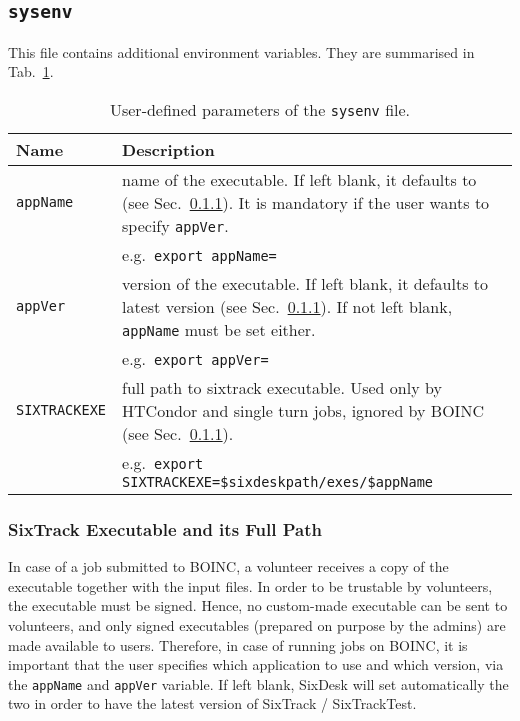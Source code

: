 \subsection{\texttt{sysenv}}\label{Sec:InputFiles:sysenv}
This file contains additional environment variables.
They are summarised in Tab.~\ref{tab:sysenv}.
\begin{table}[h]
\begin{center}
    \caption{User-defined parameters of the \texttt{sysenv} file.}
    \label{tab:sysenv}
    \begin{tabular}{|p{3cm}|p{12cm}|}
    \hline
    \rowcolor{blue!30}
    \textbf{Name} & \textbf{Description} \\
    \hline
    \texttt{appName} & name of the executable.
    If left blank, it defaults to \texttt{\whichSixTrackVersion{}} (see Sec.~\ref{Sec:SixTrackExes}).
    It is mandatory if the user wants to specify \texttt{appVer}. \\
    & e.g.~\texttt{export appName=\whichSixTrack{}} \\
    \hline
    \texttt{appVer} & version of the executable.
    If left blank, it defaults to latest version (see Sec.~\ref{Sec:SixTrackExes}).
    If not left blank, \texttt{appName} must be set either. \\
    & e.g.~\texttt{export appVer=\whichSixTrackVersion{}} \\
    \hline
    \texttt{SIXTRACKEXE} & full path to sixtrack executable.
    Used only by HTCondor and single turn jobs, ignored by BOINC
    (see Sec.~\ref{Sec:SixTrackExes}). \\
    & e.g.~\texttt{export SIXTRACKEXE=\$sixdeskpath/exes/\$appName} \\
    \hline
    \end{tabular}
\end{center}
\end{table}

\subsubsection{SixTrack Executable and its Full Path}\label{Sec:SixTrackExes}
In case of a job submitted to BOINC, a volunteer receives
a copy of the executable together with the input files. In order to
be trustable by volunteers, the executable must be signed.
Hence, no custom-made executable can be sent to volunteers, and
only signed executables (prepared on purpose by the admins)
are made available to users.
Therefore, in case of running jobs on BOINC, it is important
that the user specifies which application to use and which version,
via the \texttt{appName} and \texttt{appVer} variable. If left
blank, SixDesk will set automatically the two in order to have
the latest version of SixTrack / SixTrackTest.

